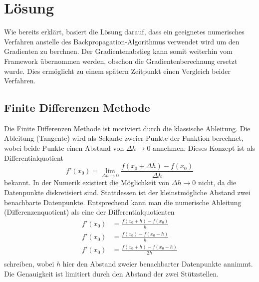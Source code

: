%
%
%
\section{Lösung
\label{ableitung:section:loesung}}
Wie bereits erklärt, basiert die Lösung darauf, dass ein geeignetes numerisches Verfahren anstelle des Backpropagation-Algorithmus verwendet wird um den Gradienten zu berchnen. Der Gradientenabstieg kann somit weiterhin vom Framework übernommen werden, obschon die Gradientenberechnung ersetzt wurde. Dies ermöglicht zu einem spätern Zeitpunkt einen Vergleich beider Verfahren.
\subsection{Finite Differenzen Methode}
Die Finite Differenzen Methode ist motiviert durch die klassische Ableitung. Die Ableitung (Tangente) wird als Sekante zweier Punkte der Funktion berechnet, wobei beide Punkte einen Abstand von $\Delta h \rightarrow 0$ annehmen.
Dieses Konzept ist als Differentialquotient
\begin{equation}
f'(x_0) = \lim_{{\Delta h} \rightarrow 0} \frac{f(x_0+\Delta h) - f(x_0)}{\Delta h}
\label{ableitung:equations:differentialquotient}
\end{equation}
bekannt. 
In der Numerik existiert die Möglichkeit von $\Delta h \rightarrow 0$ nicht, da die Datenpunkte diskretisiert sind. Stattdessen ist der kleinstmögliche Abstand zwei benachbarte Datenpunkte. Entsprechend kann man die numerische Ableitung (Differenzenquotient) als eine der Differentialquotienten
\begin{equation}
\begin{split}
f'(x_0) &= \frac{f(x_0 + h) - f(x_0)}{h} \\
f'(x_0) &= \frac{f(x_0) - f(x_0 - h)}{h} \\
f'(x_0) &= \frac{f(x_0 + h) - f(x_0 - h)}{2h} \\
\end{split}
\label{ableitung:equations:differenzenquotient}
\end{equation}
schreiben, wobei $h$ hier den Abstand zweier benachbarter Datenpunkte annimmt. Die Genauigkeit ist limitiert durch den Abstand der zwei Stützstellen.
